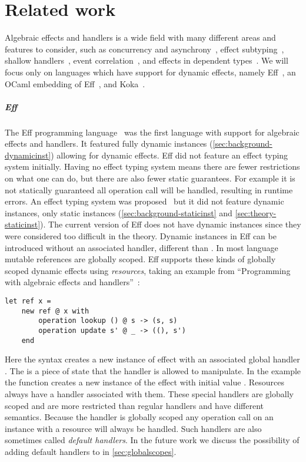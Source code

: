 \chapter{\label{chap:related}Related work}

Algebraic effects and handlers is a wide field with many different areas and features to consider, such as concurrency and asynchrony~\autocites{concurrent,async}, effect subtyping~\autocite{effectsubtyping}, shallow handlers~\autocite{shallowhandlers}, event correlation~\autocite{eventcorrelation}, and effects in dependent types~\autocite{dependenttypes}.
We will focus only on languages which have support for dynamic effects, namely Eff~\autocite{eff1}, an OCaml embedding of Eff~\autocite{effdirectly}, and Koka~\autocites{koka,koka2}.

\paragraph{Eff} \label{sec:eff}
The Eff programming language~\autocite{eff1} was the first language with support for algebraic effects and handlers.
It featured fully dynamic instances (\cref{sec:background-dynamicinst}) allowing for dynamic effects.
Eff did not feature an effect typing system initially.
Having no effect typing system means there are fewer restrictions on what one can do, but there are also fewer static guarantees.
For example it is not statically guaranteed all operation call will be handled, resulting in runtime errors.
An effect typing system was proposed~\autocite{eff2} but it did not feature dynamic instances, only static instances (\cref{sec:background-staticinst} and \cref{sec:theory-staticinst}).
The current version of Eff does not have dynamic instances since they were considered too difficult in the theory.
Dynamic instances in Eff can be introduced without an associated handler, different than \lang{}.
In most language mutable references are globally scoped.
Eff supports these kinds of globally scoped dynamic effects using \emph{resources},
taking an example from ``Programming with algebraic effects and handlers''~\autocite{eff1}:

\begin{verbatim}
let ref x =
	new ref @ x with
		operation lookup () @ s -> (s, s)
		operation update s' @ _ -> ((), s')
	end
\end{verbatim}
Here the  syntax creates a new instance of effect  with an associated global handler .
The  is a piece of state that the handler is allowed to manipulate.
In the example the  function creates a new instance of the  effect with initial value .
Resources always have a handler associated with them.
These special handlers are globally scoped and are more restricted than regular handlers and have different semantics.
Because the handler is globally scoped any operation call on an instance with a resource will always be handled.
Such handlers are also sometimes called \emph{default handlers}.
In the future work we discuss the possibility of adding default handlers to \lang{} in \cref{sec:globalscopes}.
\\\\
\pagebreak

